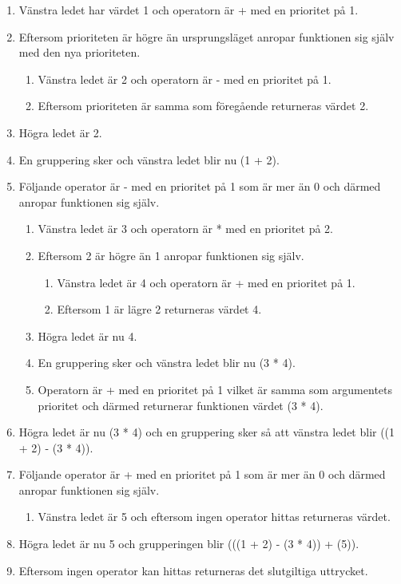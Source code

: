 \begin{enumerate}\itemsep1pt \parskip0pt 
  \item Vänstra ledet har värdet 1 och operatorn är + med en prioritet på 1.
  \item Eftersom prioriteten är högre än ursprungsläget anropar funktionen sig
    själv med den nya prioriteten.
    \begin{enumerate}
      \item Vänstra ledet är 2 och operatorn är - med en prioritet på 1.
      \item Eftersom prioriteten är samma som föregående returneras värdet 2.
    \end{enumerate}
  \item Högra ledet är 2.
  \item En gruppering sker och vänstra ledet blir nu (1 + 2).
  \item Följande operator är - med en prioritet på 1 som är mer än 0 och
    därmed anropar funktionen sig själv.
    \begin{enumerate}
      \item Vänstra ledet är 3 och operatorn är * med en prioritet på 2.
      \item Eftersom 2 är högre än 1 anropar funktionen sig själv.
      \begin{enumerate}
        \item Vänstra ledet är 4 och operatorn är + med en prioritet på 1.
        \item Eftersom 1 är lägre 2 returneras värdet 4.
      \end{enumerate}
      \item Högra ledet är nu 4.
      \item En gruppering sker och vänstra ledet blir nu (3 * 4).
      \item Operatorn är + med en prioritet på 1 vilket är samma som
        argumentets prioritet och därmed returnerar funktionen värdet (3 * 4).
    \end{enumerate}
  \item Högra ledet är nu (3 * 4) och en gruppering sker så att vänstra ledet
    blir ((1 + 2) - (3 * 4)).
  \item Följande operator är + med en prioritet på 1 som är mer än 0 och
    därmed anropar funktionen sig själv.
    \begin{enumerate}
      \item Vänstra ledet är 5 och eftersom ingen operator hittas returneras
        värdet.
    \end{enumerate}
  \item Högra ledet är nu 5 och grupperingen blir (((1 + 2) - (3 * 4)) + (5)).
  \item Eftersom ingen operator kan hittas returneras det slutgiltiga
    uttrycket.
\end{enumerate}

